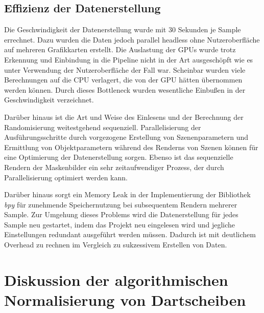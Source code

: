 \subsection{Effizienz der Datenerstellung}

Die Geschwindigkeit der Datenerstellung wurde mit 30 Sekunden je Sample errechnet. Dazu wurden die Daten jedoch parallel headless ohne Nutzeroberfläche auf mehreren Grafikkarten erstellt. Die Auslastung der GPUs wurde trotz Erkennung und Einbindung in die Pipeline nicht in der Art ausgeschöpft wie es unter Verwendung der Nutzeroberfläche der Fall war. Scheinbar wurden viele Berechnungen auf die CPU verlagert, die von der GPU hätten übernommen werden können. Durch dieses Bottleneck wurden wesentliche Einbußen in der Geschwindigkeit verzeichnet.

Darüber hinaus ist die Art und Weise des Einlesens und der Berechnung der Randomisierung weitestgehend sequenziell. Parallelisierung der Ausführungsschritte durch vorgezogene Erstellung von Szenenparametern und Ermittlung von Objektparametern während des Renderns von Szenen können für eine Optimierung der Datenerstellung sorgen. Ebenso ist das sequenzielle Rendern der Maskenbilder ein sehr zeitaufwendiger Prozess, der durch Parallelisierung optimiert werden kann.

Darüber hinaus sorgt ein Memory Leak in der Implementierung der Bibliothek \textit{bpy} für zunehmende Speichernutzung bei subsequentem Rendern mehrerer Sample. Zur Umgehung dieses Problems wird die Datenerstellung für jedes Sample neu gestartet, indem das Projekt neu eingelesen wird und jegliche Einstellungen redundant ausgeführt werden müssen. Dadurch ist mit deutlichem Overhead zu rechnen im Vergleich zu sukzessivem Erstellen von Daten.




\section{Diskussion der algorithmischen Normalisierung von Dartscheiben}
\label{sec:diskussion:cv}


